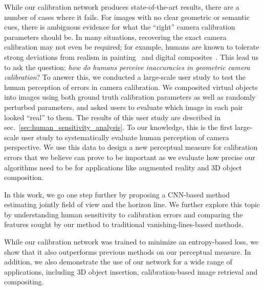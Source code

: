 While our calibration network produces state-of-the-art results, there are a number of cases where it fails. For images with no clear geometric or semantic cues, there is ambiguous evidence for what the ``right'' camera calibration parameters should be. In many situations, recovering the exact camera calibration may not even be required; for example, humans are known to tolerate strong deviations from realism in painting~\cite{Cavanagh2005} and digital composites~\cite{Farid2010}. This lead us to ask the question: \emph{how do humans perceive inaccuracies in geometric camera calibration}? To answer this, we conducted a large-scale user study to test the human perception of errors in camera calibration. We composited virtual objects into images using both ground truth calibration parameters as well as randomly perturbed parameters, and asked users to evaluate which image in each pair looked ``real'' to them. The results of this user study are described in sec.~\ref{sec:human_sensitivity_analysis}. To our knowledge, this is the first large-scale user study to systematically evaluate human perception of camera perspective. We use this data to design a new perceptual measure for calibration errors that we believe can prove to be important as we evaluate how precise our algorithms need to be for applications like augmented reality and 3D object composition.

In this work, we go one step further by proposing a CNN-based method estimating jointly field of view and the horizon line. We further explore this topic by understanding human sensitivity to calibration errors and comparing the features sought by our method to traditional vanishing-lines-based methods.

While our calibration network was trained to minimize an entropy-based loss, we show that it also outperforms previous methods on our perceptual measure. In addition, we also demonstrate the use of our network for a wide range of applications, including 3D object insertion, calibration-based image retrieval and compositing.  

